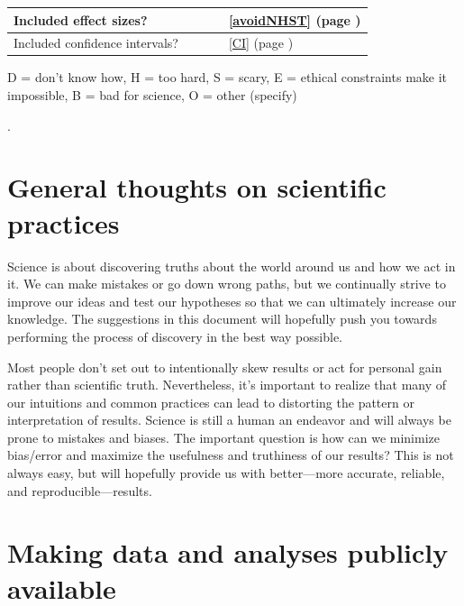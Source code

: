 \documentclass[letterpaper,oneside,11pt,article, portrait]{memoir}
\begin{document}
\begin{table}[t]
\begin{tabular}{| p{3.5in} | c | c | c | l |}
Included effect sizes? 	& & & & \ref{avoidNHST} (page \pageref{avoidNHST})  \\ \hline

Included confidence intervals? & & & & \ref{CI} (page \pageref{CI}) \\ \hline

\end{tabular}

{\scriptsize * D = don't know how, H = too hard, S = scary, E = ethical constraints make it impossible, B = bad for science, O = other (specify)}

\end{table}

\clearpage

\pagestyle{footer}

.

\chapter{General thoughts on scientific practices} \label{general}

Science is about discovering truths about the world around us and how we act in it. We can make mistakes or go down wrong paths, but we continually strive to improve our ideas and test our hypotheses so that we can ultimately increase our knowledge. The suggestions in this document will hopefully push you towards performing the process of discovery in the best way possible.

Most people don't set out to intentionally skew results or act for personal gain rather than scientific truth. Nevertheless, it's important to realize that many of our intuitions and common practices can lead to distorting the pattern or interpretation of results. Science is still a human an endeavor and will always be prone to mistakes and biases. The important question is how can we minimize bias/error and maximize the usefulness and truthiness of our results? This is not always easy, but will hopefully provide us with better---more accurate, reliable, and reproducible---results.

\chapter{Making data and analyses publicly available} \label{open}
\end{document}
